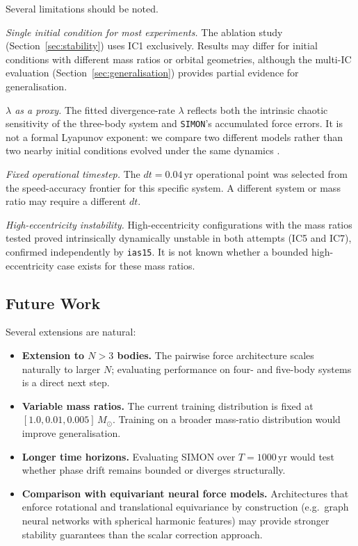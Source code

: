 \documentclass[12pt]{article}
\begin{document}
Several limitations should be noted.

\textit{Single initial condition for most experiments.} The ablation study (Section~\ref{sec:stability}) uses IC1 exclusively. Results may differ for initial conditions with different mass ratios or orbital geometries, although the multi-IC evaluation (Section~\ref{sec:generalisation}) provides partial evidence for generalisation.

\textit{$\lambda$ as a proxy.} The fitted divergence-rate $\lambda$ reflects both the intrinsic chaotic sensitivity of the three-body system and \texttt{SIMON}'s accumulated force errors. It is not a formal Lyapunov exponent: we compare two different models rather than two nearby initial conditions evolved under the same dynamics \citep{sep-chaos}.

\textit{Fixed operational timestep.} The $dt = 0.04$\,yr operational point was selected from the speed-accuracy frontier for this specific system. A different system or mass ratio may require a different $dt$.

\textit{High-eccentricity instability.} High-eccentricity configurations with the mass ratios tested proved intrinsically dynamically unstable in both attempts (IC5 and IC7), confirmed independently by \texttt{ias15}. It is not known whether a bounded high-eccentricity case exists for these mass ratios.

\subsection{Future Work}

Several extensions are natural:

\begin{itemize}
  \item \textbf{Extension to $N > 3$ bodies.} The pairwise force architecture scales
        naturally to larger $N$; evaluating performance on four- and five-body systems
        is a direct next step.
  \item \textbf{Variable mass ratios.} The current training distribution is fixed at
        $[1.0, 0.01, 0.005]\,M_\odot$. Training on a broader mass-ratio distribution
        would improve generalisation.
  \item \textbf{Longer time horizons.} Evaluating SIMON over $T = 1000$\,yr would
        test whether phase drift remains bounded or diverges structurally.
  \item \textbf{Comparison with equivariant neural force models.} Architectures that
        enforce rotational and translational equivariance by construction (e.g.\
        graph neural networks with spherical harmonic features) may provide stronger
        stability guarantees than the scalar correction approach.
\end{itemize}

\newpage




\end{document}
